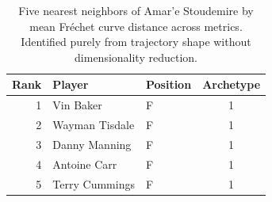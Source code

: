 \begin{table}[htbp]
  \centering\small
  \begin{tabular}{rllc}
    \toprule
    Rank & Player & Position & Archetype \\
    \midrule
    1 & Vin Baker & F & 1 \\
    2 & Wayman Tisdale & F & 1 \\
    3 & Danny Manning & F & 1 \\
    4 & Antoine Carr & F & 1 \\
    5 & Terry Cummings & F & 1 \\
    \bottomrule
  \end{tabular}
  \caption{Five nearest neighbors of Amar'e Stoudemire by mean Fr\'{e}chet curve distance across metrics. Identified purely from trajectory shape without dimensionality reduction.}
  \label{tab:Amar_e_Stoudemire_frechet_curve_neighbors}
\end{table}


